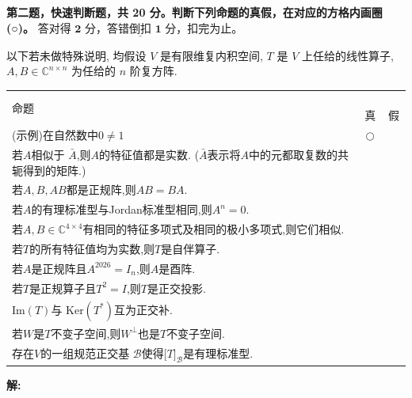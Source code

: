 \textbf{第二题，快速判断题，共 20 分。判断下列命题的真假，在对应的方格内画圈(○)。}
$\underline{\textbf{答对得 2 分，答错倒扣 1 分，扣完为止。}}$

以下若未做特殊说明, 均假设 \(V\) 是有限维复内积空间, \(T\) 是 \(V\) 上任给的线性算子, 
\(A, B \in \mathbb{C}^{n \times n}\) 为任给的 \(n\) 阶复方阵.

\begin{center}\begin{tabular}{lcc}
命题 & \,真 & \,假 \\
(示例)在自然数中$0 \neq 1$ & $\bigcirc$ & \\
若$A$相似于 $\bar{A}$,则$A$的特征值都是实数. ($\bar{A}$表示将$A$中的元都取复数的共轭得到的矩阵.) & & \\
若$A,B,AB$都是正规阵,则$AB=BA$. & & \\
若$A$的有理标准型与Jordan标准型相同,则$A^{n}=0$. & & \\
若$A,B \in \mathbb{C}^{4\times4}$有相同的特征多项式及相同的极小多项式,则它们相似. & & \\
若$T$的所有特征值均为实数,则$T$是自伴算子. & & \\
若$A$是正规阵且$A^{2026}=I_{n}$,则$A$是酉阵. & & \\
若$T$是正规算子且$T^{2}=I$,则$T$是正交投影. & & \\
$\text{Im}(T)$与 $\text{Ker}(T^*)$互为正交补. & & \\
若$W$是$T$不变子空间,则$W^{ \perp}$也是$T$不变子空间. & & \\
存在$V$的一组规范正交基 $\mathcal{B}$使得${[}T{]}_{ \mathcal{B}}$是有理标准型. & & 
\end{tabular}\end{center}

\textbf{解:}


